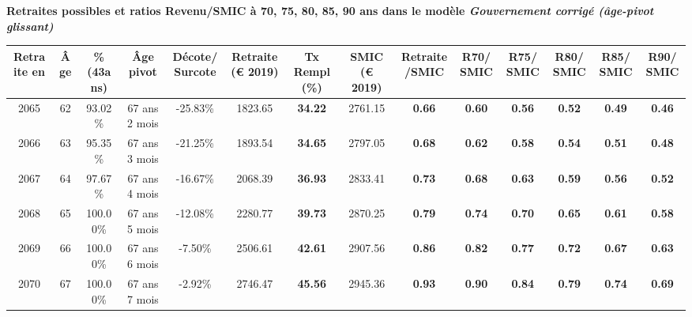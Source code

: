  \vspace{0.1cm} 
{\bf \noindent Retraites possibles et ratios Revenu/SMIC à 70, 75, 80, 85, 90 ans dans le modèle \emph{Gouvernement corrigé (âge-pivot glissant)}}  
 
\begin{adjustbox}{max width=\textwidth} 
\begin{tabular}[htb]{|c|c||c|c|c||c|c||c|c||c|c|c|c|c|} 
\hline 
 Retraite en &  Âge &  \%(43ans) &  Âge pivot &  Décote/Surcote &  Retraite (\euro{} 2019) &  Tx Rempl(\%) &  SMIC (\euro{} 2019) &  Retraite/SMIC &  R70/SMIC &  R75/SMIC &  R80/SMIC &  R85/SMIC &  R90/SMIC \\ 
\hline \hline 
 2065 &  62 &  93.02\% &  67 ans 2 mois &  -25.83\% &  1823.65 &  {\bf 34.22} &  2761.15 &  {\bf {\color{red} 0.66}} &  {\bf {\color{red} 0.60}} &  {\bf {\color{red} 0.56}} &  {\bf {\color{red} 0.52}} &  {\bf {\color{red} 0.49}} &  {\bf {\color{red} 0.46}} \\ 
\hline 
 2066 &  63 &  95.35\% &  67 ans 3 mois &  -21.25\% &  1893.54 &  {\bf 34.65} &  2797.05 &  {\bf {\color{red} 0.68}} &  {\bf {\color{red} 0.62}} &  {\bf {\color{red} 0.58}} &  {\bf {\color{red} 0.54}} &  {\bf {\color{red} 0.51}} &  {\bf {\color{red} 0.48}} \\ 
\hline 
 2067 &  64 &  97.67\% &  67 ans 4 mois &  -16.67\% &  2068.39 &  {\bf 36.93} &  2833.41 &  {\bf {\color{red} 0.73}} &  {\bf {\color{red} 0.68}} &  {\bf {\color{red} 0.63}} &  {\bf {\color{red} 0.59}} &  {\bf {\color{red} 0.56}} &  {\bf {\color{red} 0.52}} \\ 
\hline 
 2068 &  65 &  100.00\% &  67 ans 5 mois &  -12.08\% &  2280.77 &  {\bf 39.73} &  2870.25 &  {\bf {\color{red} 0.79}} &  {\bf {\color{red} 0.74}} &  {\bf {\color{red} 0.70}} &  {\bf {\color{red} 0.65}} &  {\bf {\color{red} 0.61}} &  {\bf {\color{red} 0.58}} \\ 
\hline 
 2069 &  66 &  100.00\% &  67 ans 6 mois &  -7.50\% &  2506.61 &  {\bf 42.61} &  2907.56 &  {\bf {\color{red} 0.86}} &  {\bf {\color{red} 0.82}} &  {\bf {\color{red} 0.77}} &  {\bf {\color{red} 0.72}} &  {\bf {\color{red} 0.67}} &  {\bf {\color{red} 0.63}} \\ 
\hline 
 2070 &  67 &  100.00\% &  67 ans 7 mois &  -2.92\% &  2746.47 &  {\bf 45.56} &  2945.36 &  {\bf {\color{red} 0.93}} &  {\bf {\color{red} 0.90}} &  {\bf {\color{red} 0.84}} &  {\bf {\color{red} 0.79}} &  {\bf {\color{red} 0.74}} &  {\bf {\color{red} 0.69}} \\ 
\hline 
\hline 
\end{tabular} 
\end{adjustbox} 
 
